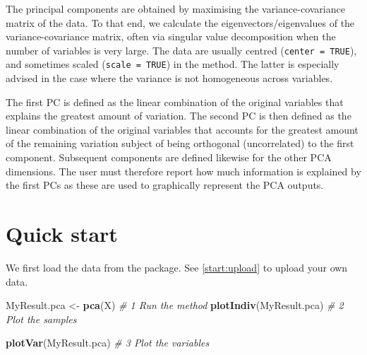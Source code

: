 \documentclass[]{book}
\newenvironment{Shaded}{\begin{snugshade}}{\end{snugshade}}
\newcommand{\KeywordTok}[1]{\textcolor[rgb]{0.13,0.29,0.53}{\textbf{#1}}}
\newcommand{\StringTok}[1]{\textcolor[rgb]{0.31,0.60,0.02}{#1}}
\newcommand{\CommentTok}[1]{\textcolor[rgb]{0.56,0.35,0.01}{\textit{#1}}}
\newcommand{\OperatorTok}[1]{\textcolor[rgb]{0.81,0.36,0.00}{\textbf{#1}}}
\newcommand{\NormalTok}[1]{#1}
\theoremstyle{definition}
\theoremstyle{definition}
\theoremstyle{definition}
\theoremstyle{remark}
\begin{document}
The principal components are obtained by maximising the
variance-covariance matrix of the data. To that end, we calculate the
eigenvectors/eigenvalues of the variance-covariance matrix, often via
singular value decomposition when the number of variables is very large.
The data are usually centred (\texttt{center\ =\ TRUE}), and sometimes
scaled (\texttt{scale\ =\ TRUE}) in the method. The latter is especially
advised in the case where the variance is not homogeneous across
variables.

The first PC is defined as the linear combination of the original
variables that explains the greatest amount of variation. The second PC
is then defined as the linear combination of the original variables that
accounts for the greatest amount of the remaining variation subject of
being orthogonal (uncorrelated) to the first component. Subsequent
components are defined likewise for the other PCA dimensions. The user
must therefore report how much information is explained by the first PCs
as these are used to graphically represent the PCA outputs.

\section{Quick start}\label{quick-start}

We first load the data from the package. See \ref{start:upload} to
upload your own data.

\begin{Shaded}
\end{Shaded}

\begin{Shaded}
\begin{Highlighting}[]
\NormalTok{MyResult.pca <-}\StringTok{ }\KeywordTok{pca}\NormalTok{(X)     }\CommentTok{# 1 Run the method}
\KeywordTok{plotIndiv}\NormalTok{(MyResult.pca)    }\CommentTok{# 2 Plot the samples}
\end{Highlighting}
\end{Shaded}

\begin{Shaded}
\begin{Highlighting}[]
\KeywordTok{plotVar}\NormalTok{(MyResult.pca)      }\CommentTok{# 3 Plot the variables}
\end{Highlighting}
\end{Shaded}
\end{document}
